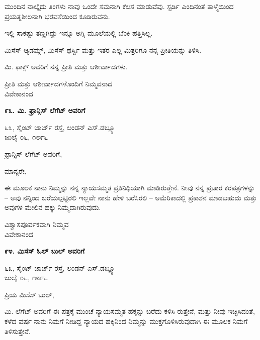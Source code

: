 ಮುಂದಿನ ನಾಲ್ಕೈದು ತಿಂಗಳು ನಾವು ಒಂದೇ ಸಮನಾಗಿ ಕೆಲಸ ಮಾಡುವೆವು. ಸ್ಟರ್ಡಿ ಎಂದಿನಂತೆ ತಾಳ್ಮೆಯಿಂದ ಪ್ರಯತ್ನಶೀಲನಾಗಿ ಭರವಸೆಯಿಂದ ಕೂಡಿರುವನು.

ಇಲ್ಲಿ ಸಾಕಷ್ಟು ತಣ್ಣಗಿದ್ದು ಇನ್ನೂ ಅಗ್ನಿ ಮೂಲೆಯಲ್ಲಿ ಬೆಂಕಿ ಹತ್ತಿಸಿಲ್ಲ.

ಮಿಸೆಸ್ ಆ್ಯಡಮ್ಸ್, ಮಿಸೆಸ್ ಥರ್ಸ್ಬಿ ಮತ್ತು ಇತರ ಎಲ್ಲ ಮಿತ್ರರಿಗೂ ನನ್ನ ಪ್ರೀತಿಯನ್ನು ತಿಳಿಸಿ.

ಮಿ. ಫಾಕ್ಸ್ ಅವರಿಗೆ ನನ್ನ ಪ್ರೀತಿ ಮತ್ತು ಆಶೀರ್ವಾದಗಳು.

\begin{flushright}
ಪ್ರೀತಿ ಮತ್ತು ಆಶೀರ್ವಾದಗಳೊಂದಿಗೆ ನಿಮ್ಮವನಾದ\\ವಿವೇಕಾನಂದ
\end{flushright}

\begin{center}
\textbf{೯೩. ಮಿ. ಫ್ರಾನ್ಸಿಸ್ ಲೆಗೆಟ್ ಅವರಿಗೆ}
\end{center}

\begin{flushright}
೬೩, ಸೈಂಟ್ ಜಾರ್ಜ್ ರಸ್ತೆ, ಲಂಡನ್ ಎಸ್.ಡಬ್ಲ್ಯೂ\\ಜುಲೈ ೦೬, ೧೮೯೬
\end{flushright}

ಫ್ರಾನ್ಸಿಸ್ ಲೆಗೆಟ್ ಅವರಿಗೆ,

ಮಾನ್ಯರೇ,

ಈ ಮೂಲಕ ನಾನು ನಿಮ್ಮನ್ನು ನನ್ನ ನ್ಯಾಯಸಮ್ಮತ ಪ್ರತಿನಿಧಿಯಾಗಿ ಮಾಡಿರುತ್ತೇನೆ. ನೀವು ನನ್ನ ಪ್ರಚಾರ ಕರಪತ್ರಗಳನ್ನು – ಅವು ನನ್ನಿಂದ ಬರೆಯಲ್ಪಟ್ಟಿರಲಿ ಇಲ್ಲವೇ ನಾನು ಹೇಳಿ ಬರೆಸಿರಲಿ – ಅಮೆರಿಕಾದಲ್ಲಿ ಪ್ರಕಾಶನ ಮಾಡಬಹುದು ಮತ್ತು ಅವುಗಳ ಮೇಲಿನ ಹಕ್ಕು ನಿಮ್ಮದಾಗಿರುವುದು.

\begin{flushright}
ವಿಶ್ವಾಸಪೂರ್ವಕವಾಗಿ ನಿಮ್ಮವ\\ವಿವೇಕಾನಂದ
\end{flushright}

\begin{center}
\textbf{೯೪. ಮಿಸೆಸ್ ಓಲ್ ಬುಲ್ ಅವರಿಗೆ}
\end{center}

\begin{flushright}
೬೩, ಸೈಂಟ್ ಜಾರ್ಜ್ ರಸ್ತೆ, ಲಂಡನ್ ಎಸ್.ಡಬ್ಲ್ಯೂ\\ಜುಲೈ ೦೬, ೧೮೯೬
\end{flushright}

ಪ್ರಿಯ ಮಿಸೆಸ್ ಬುಲ್,

ಮಿ. ಲೆಗೆಟ್ ಅವರಿಗೆ ಈ ಪತ್ರಕ್ಕೆ ಮುಂಚೆ ನ್ಯಾಯಸಮ್ಮತ ಹಕ್ಕನ್ನು ಬರೆದು ಕಳಿಸಿ ರುತ್ತೇನೆ, ಮತ್ತು ನೀವು ಇಚ್ಛಿಸಿದಂತೆ, ಕಳೆದ ವರ್ಷ ನಾನು ನಿಮಗೆ ನೀಡಿದ್ದ ನ್ಯಾಯದ ಹಕ್ಕಿನಿಂದ ನಿಮ್ಮನ್ನು ಮುಕ್ತಗೊಳಿಸಿರುವುದಾಗಿ ಈ ಮೂಲಕ ನಿಮಗೆ ತಿಳಿಸುತ್ತೇನೆ.

